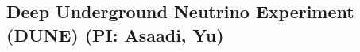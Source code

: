\documentclass[11pt]{article}
\def\threehead#1{\subsection{#1}}
\begin{document}
\threehead{Deep Underground Neutrino Experiment (DUNE) (PI: Asaadi, Yu)}




\end{document}
